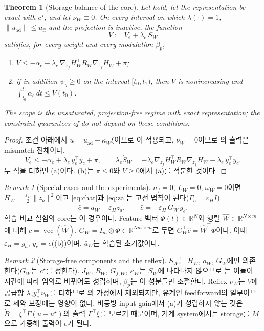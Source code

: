 \documentclass[11pt]{article}\usepackage[margin=1in]{geometry}\usepackage{amsmath,amssymb,amsthm,mathtools}\usepackage{graphicx}\graphicspath{{figures/}{../figures/}{figs/}{./}}\usepackage{enumitem}\usepackage{hyperref}\usepackage{cleveref}\usepackage{tikz}\usetikzlibrary{arrows.meta,positioning,calc,shapes.geometric}\usepackage{float}\usepackage{rotating}\usepackage[most]{tcolorbox}\usepackage{kotex}\usepackage{booktabs}\emergencystretch=1.6em\tolerance=2000 \crefname{assumption}{Assumption}{Assumptions}\Crefname{assumption}{Assumption}{Assumptions}\crefname{definition}{Definition}{Definitions}\Crefname{definition}{Definition}{Definitions}\crefname{proposition}{Proposition}{Propositions}\Crefname{proposition}{Proposition}{Propositions}\crefname{fact}{Fact}{Facts}\Crefname{fact}{Fact}{Facts} \newtheorem{assumption}{Assumption}\newtheorem{definition}{Definition}\newtheorem{lemma}{Lemma}\newtheorem{proposition}{Proposition}\newtheorem{theorem}{Theorem}\newtheorem{corollary}{Corollary}\newtheorem{fact}{Fact}\theoremstyle{remark}\newtheorem{remark}{Remark} \newcommand{\R}{\mathbb{R}}\newcommand{\xb}{\bar x}\newcommand{\Ab}{\bar A}\newcommand{\By}{\bar B_y}\newcommand{\U}{\mathcal U}\newcommand{\Z}{\mathcal Z}
\begin{document}
\begin{theorem}[Storage balance of the core]
\label{thm:balance}
Let  hold, let the representation be exact with $c^\star$, and let $\nu_W\equiv0$. On every interval on which $\lambda(\cdot)=1$, $\|u_{\mathrm{ad}}\|\le\bar u_{\mathrm{ff}}$ and the projection is inactive, the function
\[
V:=V_e+\lambda_e\,S_W
\]
satisfies, for every weight and every modulation $\beta_p$,
\begin{enumerate}[label=(\alph*)]
\item $\dot V\le-\alpha_e-\lambda_e\,\nabla_{z_f}H_W^\top R_W\nabla_{z_f}H_W+\pi$;
\item if in addition $\dot\psi_g\ge0$ on the interval $[t_0,t_1)$, then $V$ is nonincreasing and $\int_{t_0}^{t_1}\alpha_e\,dt\le V(t_0)$.
\end{enumerate}
The scope is the unsaturated, projection-free regime with exact representation; the constraint guarantees of  do not depend on these conditions.
\end{theorem}

\begin{proof}
조건 아래에서 $u=u_{\mathrm{ad}}-\kappa_W\xi$이므로 이 적용되고, $\nu_W=0$이므로 의 출력은 mismatch 전체이다.
\[
\dot V_e\le-\alpha_e+\lambda_e\,y_e^\top y_c+\pi,\qquad \lambda_e\dot S_W=-\lambda_e\nabla_{z_f}H_W^\top R_W\nabla_{z_f}H_W-\lambda_e\,y_e^\top y_c .
\]
두 식을 더하면 (a)이다. (b)는 $\pi\le0$와 $V\ge0$에서 (a)를 적분한 것이다.
\end{proof}

\begin{remark}[Special cases and the experiments]
\label{rem:coreinst}
$n_f=0$, $L_W=0$, $\omega_W=0$이면 $H_W=\tfrac{\varepsilon_H}{2}\|z_a\|^2$이고 \eqref{eq:chat}과 \eqref{eq:za}는 고전 법칙이 된다($\Gamma_a=\varepsilon_HI$).
\[
\hat c=\bar a_W+\varepsilon_Hz_a,\qquad \dot{\hat c}=-\varepsilon_H\,G_W\,y_e .
\]
학습 비교 실험의 core는 이 경우이다. Feature 벡터 $\Phi(t)\in\R^{N}$와 행렬 $\hat W\in\R^{N\times m}$에 대해 $\hat c=\operatorname{vec}(\hat W)$, $G_W=I_m\otimes\Phi\in\R^{Nm\times m}$로 두면 $G_W^\top\hat c=\hat W^\top\Phi$이다. 이때 $\varepsilon_H=g_a$, $y_e=e$((b))이며, $\bar a_W$는 학습된 초기값이다.
\end{remark}

\begin{remark}[Storage-free components and the reflex]
\label{rem:storagefree}
$S_W$는 $H_W$, $\bar a_W$, $G_W$에만 의존한다($G_W$는 $c^\star$를 정한다). $J_W$, $R_W$, $G_{f,W}$, $\kappa_W$는 $S_W$에 나타나지 않으므로 는 이들이 시간에 따라 임의로 바뀌어도 성립하며, $\beta_p$는 이 성분들만 조절한다. Reflex $\nu_W$는 $\dot V$에 공급항 $\lambda_e y_e^\top\nu_W$를 더하므로 의 가정에서 제외되지만, 유계인 feedforward의 일부이므로 제약 보장에는 영향이 없다. 비등방 input gain에서 (a)가 성립하지 않는 것은 $\dot B=\xi^\top\Gamma(u-u^\star)$의 출력 $\Gamma^\top\xi$를 모르기 때문이며, 기계 system에서는 storage를 $M$으로 가중해 출력이 $e$가 된다.
\end{remark}
\end{document}
